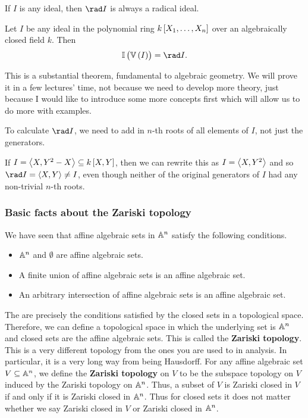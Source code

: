 \begin{note*}
If $ I $ is any ideal, then $ \rad I $ is always a radical ideal.
\end{note*}

\begin{theorem}
Let $ I $ be any ideal in the polynomial ring $ k\sbr{X_1, \dots, X_n} $ over an algebraically closed field $ k $. Then
$$ \II\br{\VV\br{I}} = \rad I. $$
\end{theorem}

This is a substantial theorem, fundamental to algebraic geometry. We will prove it in a few lectures' time, not because we need to develop more theory, just because I would like to introduce some more concepts first which will allow us to do more with examples.

\begin{note*}
To calculate $ \rad I $, we need to add in $ n $-th roots of all elements of $ I $, not just the generators.
\end{note*}

\begin{example*}
If $ I = \abr{X, Y^2 - X} \subseteq k\sbr{X, Y} $, then we can rewrite this as $ I = \abr{X, Y^2} $ and so $ \rad I = \abr{X, Y} \ne I $, even though neither of the original generators of $ I $ had any non-trivial $ n $-th roots.
\end{example*}

\subsubsection{Basic facts about the Zariski topology}

We have seen that affine algebraic sets in $ \AA^n $ satisfy the following conditions.
\begin{itemize}
\item $ \AA^n $ and $ \emptyset $ are affine algebraic sets.
\item A finite union of affine algebraic sets is an affine algebraic set.
\item An arbitrary intersection of affine algebraic sets is an affine algebraic set.
\end{itemize}
The are precisely the conditions satisfied by the closed sets in a topological space. Therefore, we can define a topological space in which the underlying set is $ \AA^n $ and closed sets are the affine algebraic sets. This is called the \textbf{Zariski topology}. This is a very different topology from the ones you are used to in analysis. In particular, it is a very long way from being Hausdorff. For any affine algebraic set $ V \subseteq \AA^n $, we define the \textbf{Zariski topology} on $ V $ to be the subspace topology on $ V $ induced by the Zariski topology on $ \AA^n $. Thus, a subset of $ V $ is Zariski closed in $ V $ if and only if it is Zariski closed in $ \AA^n $. Thus for closed sets it does not matter whether we say Zariski closed in $ V $ or Zariski closed in $ \AA^n $.

